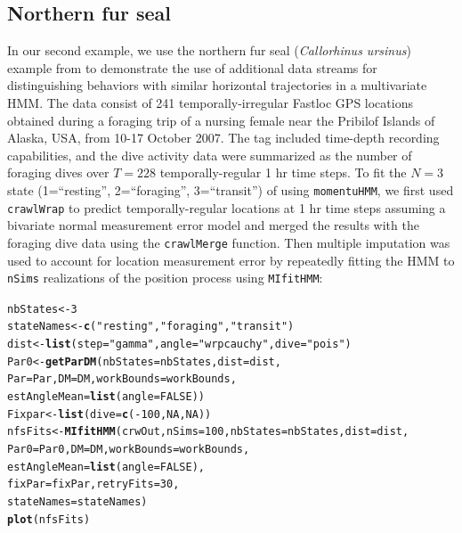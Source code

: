 \documentclass[12pt]{article}\usepackage[]{graphicx}\usepackage[]{xcolor}
\makeatletter
\newcommand{\hlnum}[1]{\textcolor[rgb]{0.686,0.059,0.569}{#1}}%
\newcommand{\hlsng}[1]{\textcolor[rgb]{0.192,0.494,0.8}{#1}}%
\newcommand{\hlopt}[1]{\textcolor[rgb]{0,0,0}{#1}}%
\newcommand{\hldef}[1]{\textcolor[rgb]{0.345,0.345,0.345}{#1}}%
\newcommand{\hlkwb}[1]{\textcolor[rgb]{0.69,0.353,0.396}{#1}}%
\newcommand{\hlkwc}[1]{\textcolor[rgb]{0.333,0.667,0.333}{#1}}%
\newcommand{\hlkwd}[1]{\textcolor[rgb]{0.737,0.353,0.396}{\textbf{#1}}}%
\newenvironment{kframe}{%
 \def\at@end@of@kframe{}%
 \ifinner\ifhmode%
  \def\at@end@of@kframe{\end{minipage}}%
  \begin{minipage}{\columnwidth}%
 \fi\fi%
 \def\FrameCommand##1{\hskip\@totalleftmargin \hskip-\fboxsep
 \colorbox{shadecolor}{##1}\hskip-\fboxsep
     \hskip-\linewidth \hskip-\@totalleftmargin \hskip\columnwidth}%
 \MakeFramed {\advance\hsize-\width
   \@totalleftmargin\z@ \linewidth\hsize
   \@setminipage}}%
 {\par\unskip\endMakeFramed%
 \at@end@of@kframe}
\newenvironment{knitrout}{}{} %
\makeatother
\begin{document}
\subsection{Northern fur seal}
\label{sec:nfs}
In our second example, we use the northern fur seal ({\it Callorhinus ursinus}) example from \cite{McClintockEtAl2014b} to demonstrate the use of additional data streams for distinguishing behaviors with similar horizontal trajectories in a multivariate HMM. The data consist of 241 temporally-irregular Fastloc GPS locations obtained during a foraging trip of a nursing female near the Pribilof Islands of Alaska, USA, from 10-17 October 2007. The tag included time-depth recording capabilities, and the dive activity data were summarized as the number of foraging dives over $T=228$ temporally-regular 1 hr time steps. To fit the $N=3$ state (1=``resting'', 2=``foraging'', 3=``transit'') of \cite{McClintockEtAl2014b} using \verb|momentuHMM|, we first used \verb|crawlWrap| to predict temporally-regular locations at 1 hr time steps assuming a bivariate normal measurement error model and merged the results with the foraging dive data using the \verb|crawlMerge| function. Then multiple imputation was used to account for location measurement error by repeatedly fitting the HMM to \verb|nSims| realizations of the position process using \verb|MIfitHMM|:%
\begin{knitrout}
\color{fgcolor}\begin{kframe}
\begin{alltt}
\hldef{nbStates} \hlkwb{<-} \hlnum{3}
\hldef{stateNames} \hlkwb{<-} \hlkwd{c}\hldef{(}\hlsng{"resting"}\hldef{,} \hlsng{"foraging"}\hldef{,} \hlsng{"transit"}\hldef{)}
\hldef{dist} \hlkwb{<-} \hlkwd{list}\hldef{(}\hlkwc{step} \hldef{=} \hlsng{"gamma"}\hldef{,} \hlkwc{angle} \hldef{=} \hlsng{"wrpcauchy"}\hldef{,} \hlkwc{dive} \hldef{=} \hlsng{"pois"}\hldef{)}
\hldef{Par0} \hlkwb{<-} \hlkwd{getParDM}\hldef{(}\hlkwc{nbStates} \hldef{= nbStates,} \hlkwc{dist} \hldef{= dist,}
                 \hlkwc{Par} \hldef{= Par,} \hlkwc{DM} \hldef{= DM,} \hlkwc{workBounds} \hldef{= workBounds,}
                 \hlkwc{estAngleMean} \hldef{=} \hlkwd{list}\hldef{(}\hlkwc{angle} \hldef{=} \hlnum{FALSE}\hldef{))}
\hldef{Fixpar} \hlkwb{<-} \hlkwd{list}\hldef{(}\hlkwc{dive} \hldef{=} \hlkwd{c}\hldef{(}\hlopt{-}\hlnum{100}\hldef{,} \hlnum{NA}\hldef{,} \hlnum{NA}\hldef{))}
\hldef{nfsFits} \hlkwb{<-} \hlkwd{MIfitHMM}\hldef{(crwOut,} \hlkwc{nSims} \hldef{=} \hlnum{100}\hldef{,} \hlkwc{nbStates} \hldef{= nbStates,} \hlkwc{dist} \hldef{= dist,}
                    \hlkwc{Par0} \hldef{= Par0,} \hlkwc{DM} \hldef{= DM,} \hlkwc{workBounds} \hldef{= workBounds,}
                    \hlkwc{estAngleMean} \hldef{=} \hlkwd{list}\hldef{(}\hlkwc{angle} \hldef{=} \hlnum{FALSE}\hldef{),}
                    \hlkwc{fixPar} \hldef{= fixPar,} \hlkwc{retryFits} \hldef{=} \hlnum{30}\hldef{,}
                    \hlkwc{stateNames}\hldef{=stateNames)}
\hlkwd{plot}\hldef{(nfsFits)}
\end{alltt}
\end{kframe}
\end{knitrout}
\end{document}
